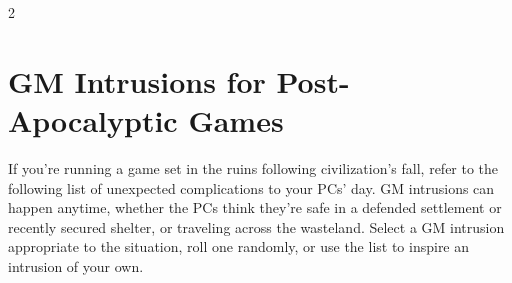 \begin{multicols}{2}

\section{GM Intrusions for Post-Apocalyptic Games} 

If you’re running a game set in the ruins following civilization’s fall, refer to the following list of unexpected complications to your PCs’ day. GM intrusions can happen anytime, whether the PCs think they’re safe in a defended settlement or recently secured shelter, or traveling across the wasteland.
Select a GM intrusion appropriate to the situation, roll one randomly, or use the list to inspire an intrusion of your own.

\end{multicols}

